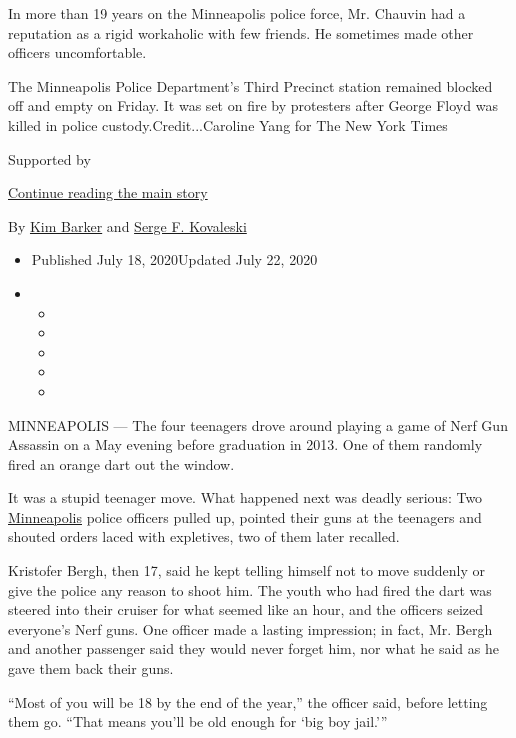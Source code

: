 In more than 19 years on the Minneapolis police force, Mr. Chauvin had a
reputation as a rigid workaholic with few friends. He sometimes made
other officers uncomfortable.

The Minneapolis Police Department's Third Precinct station remained
blocked off and empty on Friday. It was set on fire by protesters after
George Floyd was killed in police custody.Credit...Caroline Yang for The
New York Times

Supported by

\protect\hyperlink{after-sponsor}{Continue reading the main story}

By \href{https://www.nytimes3xbfgragh.onion/by/kim-barker}{Kim Barker}
and \href{https://www.nytimes3xbfgragh.onion/by/serge-f-kovaleski}{Serge
F. Kovaleski}

\begin{itemize}
\item
  Published July 18, 2020Updated July 22, 2020
\item
  \begin{itemize}
  \item
  \item
  \item
  \item
  \item
  \end{itemize}
\end{itemize}

MINNEAPOLIS --- The four teenagers drove around playing a game of Nerf
Gun Assassin on a May evening before graduation in 2013. One of them
randomly fired an orange dart out the window.

It was a stupid teenager move. What happened next was deadly serious:
Two
\href{https://www.nytimes3xbfgragh.onion/2020/07/29/us/george-floyd-memorial.html}{Minneapolis}
police officers pulled up, pointed their guns at the teenagers and
shouted orders laced with expletives, two of them later recalled.

Kristofer Bergh, then 17, said he kept telling himself not to move
suddenly or give the police any reason to shoot him. The youth who had
fired the dart was steered into their cruiser for what seemed like an
hour, and the officers seized everyone's Nerf guns. One officer made a
lasting impression; in fact, Mr. Bergh and another passenger said they
would never forget him, nor what he said as he gave them back their
guns.

``Most of you will be 18 by the end of the year,'' the officer said,
before letting them go. ``That means you'll be old enough for `big boy
jail.'''

